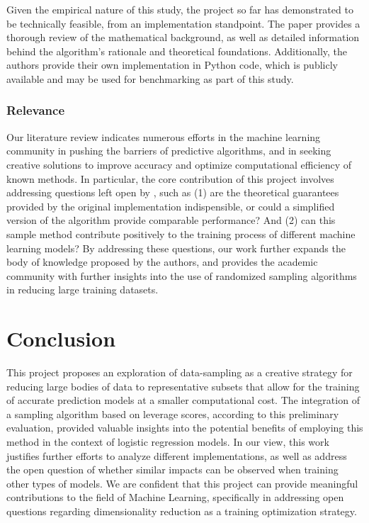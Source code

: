 \documentclass{article}
\theoremstyle{plain}
\theoremstyle{definition}
\theoremstyle{remark}
\begin{document}
Given the empirical nature of this study, the project so far has demonstrated to be technically feasible, from an implementation standpoint. The paper \cite{chow24} provides a thorough review of the mathematical background, as well as detailed information behind the algorithm's rationale and theoretical foundations. Additionally, the authors provide their own implementation in Python code, which is publicly available and may be used for benchmarking as part of this study.


\subsubsection{Relevance}

Our literature review indicates numerous efforts in the machine learning community in pushing the barriers of predictive algorithms, and in seeking creative solutions to improve accuracy and optimize computational efficiency of known methods. In particular, the core contribution of this project involves addressing questions left open by \citeauthor{chow24}, such as (1) are the theoretical guarantees provided by the original implementation indispensible, or could a simplified version of the algorithm provide comparable performance? And (2) can this sample method contribute positively to the training process of different machine learning models? By addressing these questions, our work further expands the body of knowledge proposed by the authors, and provides the academic community with further insights into the use of randomized sampling algorithms in reducing large training datasets.


\section{Conclusion}

This project proposes an exploration of data-sampling as a creative strategy for reducing large bodies of data to representative subsets that allow for the training of accurate prediction models at a smaller computational cost. The integration of a sampling algorithm based on leverage scores, according to this preliminary evaluation, provided valuable insights into the potential benefits of employing this method in the context of logistic regression models. In our view, this work justifies further efforts to analyze different implementations, as well as address the open question of whether similar impacts can be observed when training other types of models. We are confident that this project can provide meaningful contributions to the field of Machine Learning, specifically in addressing open questions regarding dimensionality reduction as a training optimization strategy.
\end{document}
